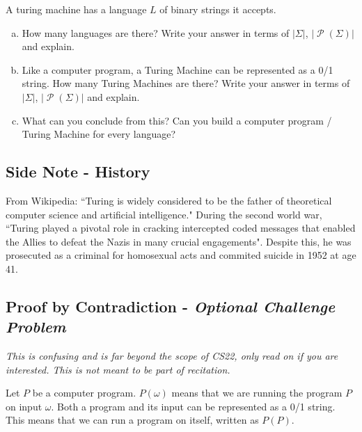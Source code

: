 \documentclass[12pt,letterpaper]{article}
\newcommand\Pow{\ensuremath{\operatorname{\mathcal{P}}}}
\begin{document}
	A turing machine has a language $L$ of binary strings it accepts.

	\begin{enumerate}[a.]
		\item How many languages are there? Write your answer in terms of $|\Sigma|$, $|\Pow(\Sigma)|$ and explain.
		\begin{mdframed}
		\vspace{4cm}
		\end{mdframed}
		\item Like a computer program, a Turing Machine can be represented as a 0/1 string. How many Turing Machines are there? Write your answer in terms of $|\Sigma|$, $|\Pow(\Sigma)|$ and explain.
		\begin{mdframed}
		\vspace{1.6cm}
		\end{mdframed}
		\item What can you conclude from this? Can you build a computer program / Turing Machine for every language?
		\begin{mdframed}
		\vspace{1.6cm}
		\end{mdframed}
 	\end{enumerate}

	\subsection*{Side Note - History}
From Wikipedia: ``Turing is widely considered to be the father of theoretical computer science and artificial intelligence." During the second world war, ``Turing played a pivotal role in cracking intercepted coded messages that enabled the Allies to defeat the Nazis in many crucial engagements". Despite this, he was prosecuted as a criminal for homosexual acts and commited suicide in 1952 at age 41.

	\subsection*{Proof by Contradiction - \textit{Optional Challenge Problem}}

	\textit{This is confusing and is far beyond the scope of CS22, only read on if you are interested. This is not meant to be part of recitation.}

	Let $P$ be a computer program. $P(\omega)$ means that we are running the program $P$ on input $\omega$. Both a program and its input can be represented as a 0/1 string. This means that we can run a program on itself, written as $P(P)$. 
\end{document}
